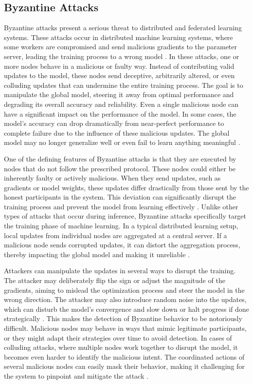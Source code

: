 \documentclass[conference]{IEEEtran}
\begin{document}
\subsection{Byzantine Attacks}
Byzantine attacks present a serious threat to distributed and federated learning systems. These attacks occur in distributed machine learning systems, where some workers are compromised and send malicious gradients to the parameter server, leading the training process to a wrong model \cite{wu2021tolerating}. In these attacks, one or more nodes behave in a malicious or faulty way. Instead of contributing valid updates to the model, these nodes send deceptive, arbitrarily altered, or even colluding updates that can undermine the entire training process. The goal is to manipulate the global model, steering it away from optimal performance and degrading its overall accuracy and reliability. Even a single malicious node can have a significant impact on the performance of the model. In some cases, the model’s accuracy can drop dramatically from near-perfect performance to complete failure due to the influence of these malicious updates. The global model may no longer generalize well or even fail to learn anything meaningful \cite{shi2022challenges}.

One of the defining features of Byzantine attacks is that they are executed by nodes that do not follow the prescribed protocol. These nodes could either be inherently faulty or actively malicious. When they send updates, such as gradients or model weights, these updates differ drastically from those sent by the honest participants in the system. This deviation can significantly disrupt the training process and prevent the model from learning effectively \cite{konstantinidis2023detection}. Unlike other types of attacks that occur during inference, Byzantine attacks specifically target the training phase of machine learning. In a typical distributed learning setup, local updates from individual nodes are aggregated at a central server. If a malicious node sends corrupted updates, it can distort the aggregation process, thereby impacting the global model and making it unreliable \cite{wang2021elite}.

Attackers can manipulate the updates in several ways to disrupt the training. The attacker may deliberately flip the sign or adjust the magnitude of the gradients, aiming to mislead the optimization process and steer the model in the wrong direction. The attacker may also introduce random noise into the updates, which can disturb the model’s convergence and slow down or halt progress if done strategically \cite{shi2022challenges}. This makes the detection of Byzantine behavior to be notoriously difficult. Malicious nodes may behave in ways that mimic legitimate participants, or they might adapt their strategies over time to avoid detection. In cases of colluding attacks, where multiple nodes work together to disrupt the model, it becomes even harder to identify the malicious intent. The coordinated actions of several malicious nodes can easily mask their behavior, making it challenging for the system to pinpoint and mitigate the attack \cite{shi2022challenges, wu2021tolerating}.
\end{document}
